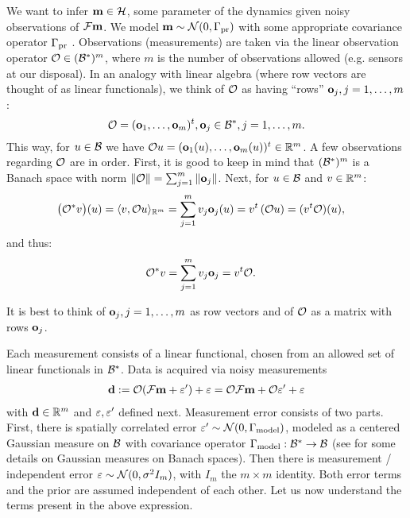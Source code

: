 \documentclass{amsart}
\numberwithin{equation}{section}
\begin{document}
We want to infer $\mathbf{m} \in \mathcal{H}$, some parameter of the dynamics
given noisy observations of $\mathcal{F} \mathbf{m}$. We model $\mathbf{m} \sim
\mathcal{N}(0,\Gamma_{\textup{pr}})$ with some appropriate covariance operator $\Gamma_{\textup{pr}}$
\cite{Stuart10}. Observations (measurements) are taken via the linear
observation operator $\mathcal{O} \in ( \mathcal{B}^* )^m$, where $m$ is the number
of observations allowed (e.g. sensors at our disposal). In an analogy
with linear algebra (where row vectors are thought of as linear
functionals), we think of $\mathcal{O}$ as having ``rows'' $\mathbf{o}_j,
j=1,\dots,m$:
\begin{equation}\label{eq:O}
  \mathcal{O} = (\mathbf{o}_1,\dots, \mathbf{o}_m)^t, \mathbf{o}_j \in \mathcal{B}^*, j = 1,\dots,m.
\end{equation}
This way, for $u \in \mathcal{B}$ we have $\mathcal{O} u = (\mathbf{o}_1(u), \dots,
\mathbf{o}_m(u) )^t \in \mathbb{R}^m$.
A few observations regarding $\mathcal{O}$ are in order. First, it is good to
keep in mind that $( \mathcal{B}^* )^m$ is a Banach space with norm $\| \mathcal{O}
\| = \sum_{j=1}^m \|\mathbf{o}_j\|$. Next, for $u \in \mathcal{B}$ and $v\in
\mathbb{R}^m$:
\begin{align*}
  \big (\mathcal{O}^*v \big ) (u) &= \langle v, \mathcal{O} u \rangle_{\mathbb{R}^m} = \sum_{j=1}^m  v_j \mathbf{o}_j(u)
  = v^t \left ( \mathcal{O} u \right ) = (v^t \mathcal{O}) (u),
\end{align*}
and thus:
\begin{align}\label{eq:obs*}
  \mathcal{O}^*v &= \sum_{j=1}^m v_j \mathbf{o}_j = v^t \mathcal{O}.
\end{align}

\begin{observation}
  It is best to think of $\mathbf{o}_j,j=1,\dots,m$ as row vectors and of
  $\mathcal{O}$ as a matrix with rows $\mathbf{o}_j$. 
\end{observation}

Each measurement consists of a linear functional, chosen from an
allowed set of linear functionals in $\mathcal{B}^{*}$. Data is acquired via
noisy measurements
\begin{align*}
  \mathbf{d} := \mathcal{O} (\mathcal{F} \mathbf{m} + \varepsilon') + \varepsilon = \mathcal{O} \mathcal{F} \mathbf{m} + \mathcal{O} \varepsilon' + \varepsilon
\end{align*}
with $\mathbf{d} \in \mathbb{R}^m$ and $\varepsilon, \varepsilon'$ defined next. Measurement
error consists of two parts. First, there is spatially correlated
error $\varepsilon' \sim \mathcal{N}(0,\Gamma_{\textup{model}})$, modeled as a centered Gaussian
measure on $\mathcal{B}$ with covariance operator $\Gamma_{\textup{model}}: \mathcal{B}^* \to \mathcal{B}$
(see \cite[section 6]{Stuart10} for some details on Gaussian measures
on Banach spaces). Then there is measurement / independent error
$\varepsilon \sim \mathcal{N}(0, \sigma^2 I_m)$, with $I_m$ the $m \times m$
identity. Both error terms and the prior are assumed independent of
each other. Let us now understand the terms present in the above
expression.
\end{document}
